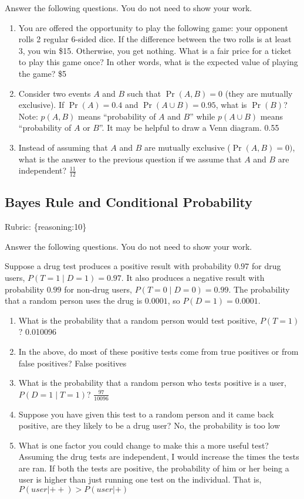 \documentclass{article}
\def\rubric#1{\gre{Rubric: \{#1\}}}{}
\def\blu#1{{\color{blu}#1}}
\def\gre#1{{\color{gre}#1}}
\def\red#1{{\color{red}#1}}
\begin{document}
\blu{Answer the following questions.} You do not need to show your work.


\begin{enumerate}
\item You are offered the opportunity to play the following game: your opponent rolls 2 regular 6-sided dice. If the difference between the two rolls is at least 3, you win \$15. Otherwise, you get nothing. What is a fair price for a ticket to play this game once? In other words, what is the expected value of playing the game? \red{\$5}
\item Consider two events $A$ and $B$ such that $\Pr(A, B)=0$ (they are mutually exclusive). If $\Pr(A) = 0.4$ and $\Pr(A \cup B) = 0.95$, what is $\Pr(B)$? Note: $p(A, B)$ means
``probability of $A$ and $B$'' while $p(A \cup B)$ means ``probability of $A$ or $B$''. It may be helpful to draw a Venn diagram. \red{0.55}
\item Instead of assuming that $A$ and $B$ are mutually exclusive ($\Pr(A,B) = 0)$, what is the answer to the previous question if we assume that $A$ and $B$ are independent? \red{$\frac{11}{12}$}

\end{enumerate}

\subsection{Bayes Rule and Conditional Probability}
\rubric{reasoning:10}

\blu{Answer the following questions.} You do not need to show your work.

Suppose a drug test produces a positive result with probability $0.97$ for drug users, $P(T=1 \mid D=1)=0.97$. It also produces a negative result with probability $0.99$ for non-drug users, $P(T=0 \mid D=0)=0.99$. The probability that a random person uses the drug is $0.0001$, so $P(D=1)=0.0001$.

\begin{enumerate}
\item What is the probability that a random person would test positive, $P(T=1)$? \red{0.010096}
\item In the above, do most of these positive tests come from true positives or from false positives? \red{False positives}
\item What is the probability that a random person who tests positive is a user, $P(D=1 \mid T=1)$? \red{$\frac{97}{10096}$}
\item Suppose you have given this test to a random person and it came back positive, are they likely to be a drug user? \red{No, the probability is too low}
\item What is one factor you could change to make this a more useful test? \red{Assuming the drug tests are independent, I would increase the times the tests are ran. If both the tests are positive, the probability of him or her being a user is higher than just running one test on the individual. That is, $P(user|++) > P (user|+)$}
\end{enumerate}
\end{document}

